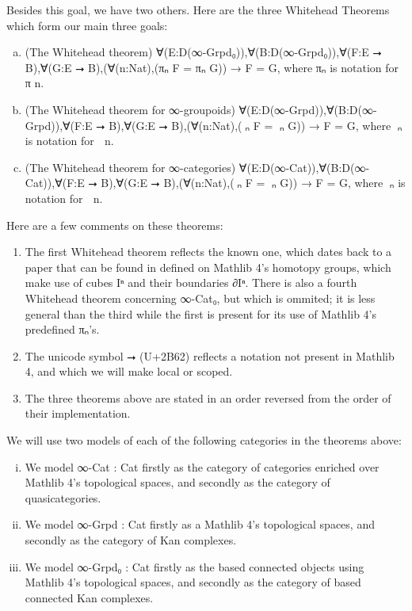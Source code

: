 \documentclass{book}
\theoremstyle{definition}
\begin{document}
Besides this goal, we have two others. Here are the three Whitehead Theorems which form our main three goals:

\begin{enumerate}[(a)]
\item (The Whitehead theorem) ∀(E:D(∞-Grpd₀)),∀(B:D(∞-Grpd₀)),∀(F:E ⭢ B),∀(G:E ⭢ B),(∀(n:Nat),(πₙ F = πₙ G)) → F = G, where πₙ is notation for π n.
\item (The Whitehead theorem for ∞-groupoids) ∀(E:D(∞-Grpd)),∀(B:D(∞-Grpd)),∀(F:E ⭢ B),∀(G:E ⭢ B),(∀(n:Nat),(π⃡ₙ F = π⃡ₙ G)) → F = G, where π⃡ₙ is notation for π⃡ n.
\item (The Whitehead theorem for ∞-categories) ∀(E:D(∞-Cat)),∀(B:D(∞-Cat)),∀(F:E ⭢ B),∀(G:E ⭢ B),(∀(n:Nat),(π⃗ₙ F = π⃗ₙ G)) → F = G, where π⃗ₙ is notation for π⃗ n.
\end{enumerate}

Here are a few comments on these theorems:
\begin{enumerate}
\item The first Whitehead theorem reflects the known one, which dates back to a paper that can be found in defined on Mathlib 4's homotopy groups, which make use of cubes Iⁿ and their boundaries ∂Iⁿ. There is also a fourth Whitehead theorem concerning ∞-Cat₀, but which is ommited; it is less general than the third while the first is present for its use of Mathlib 4's predefined πₙ's.
\item The unicode symbol ⭢ (U+2B62) reflects a notation not present in Mathlib 4, and which we will make local or scoped.
\item The three theorems above are stated in an order reversed from the order of their implementation.
\end{enumerate}

We will use two models of each of the following categories in the theorems above:

\begin{enumerate}[(i)]
\item We model ∞-Cat : Cat firstly as the category of categories enriched over Mathlib 4's topological spaces, and secondly as the category of quasicategories.
\item We model ∞-Grpd : Cat firstly as a Mathlib 4's topological spaces, and secondly as the category of Kan complexes.
\item We model ∞-Grpd₀ : Cat firstly as the based connected objects using Mathlib 4's topological spaces, and secondly as the category of based connected Kan complexes.
\end{enumerate}
\end{document}

